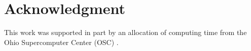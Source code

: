 \documentclass[conference]{IEEEtran}
\begin{document}
\section*{Acknowledgment}
This work was supported in part by an allocation of computing time from the Ohio Supercomputer Center (OSC) \cite{ref_osc}.

%   
%   


\end{document}
